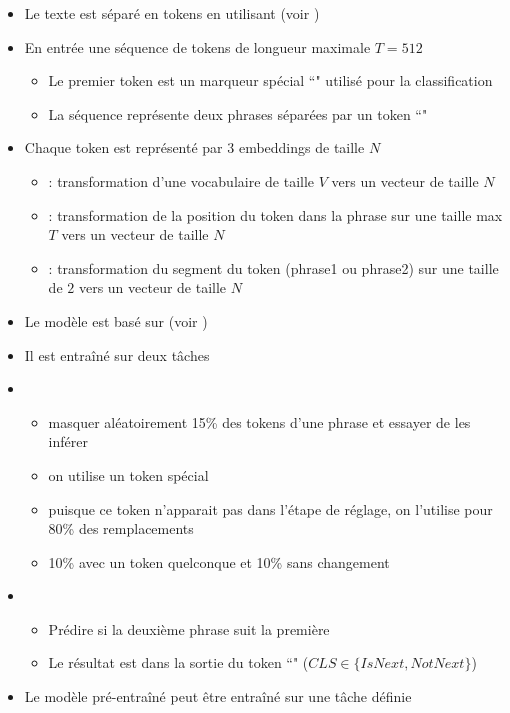 \documentclass{KodeBook}
\begin{document}

\begin{itemize}
	\item Le texte est séparé en tokens en utilisant  (voir \cite{2016-wu-al})
	\item En entrée une séquence de tokens de longueur maximale $T = 512$
	\begin{itemize}
		\item Le premier token est un marqueur spécial ``\keyword{[CLS]}" utilisé pour la classification
		\item La séquence représente deux phrases séparées par un token ``\keyword{[SEP]}"
	\end{itemize}
	\item Chaque token est représenté par 3 embeddings de taille $N$ 
	\begin{itemize}
		\item {} : transformation d'une vocabulaire de taille $V$ vers un vecteur de taille $N$
		\item {} : transformation de la position du token dans la phrase sur une taille max $T$ vers un vecteur de taille $N$
		\item {} : transformation du segment du token (phrase1 ou phrase2) sur une taille de $2$ vers un vecteur de taille $N$
	\end{itemize}
\end{itemize}

\begin{itemize}
	\item Le modèle est basé sur  (voir \cite{2017-vaswani-al})
	\item Il est entraîné sur deux tâches
	\item {}
	\begin{itemize}
		\item masquer aléatoirement 15\% des tokens d'une phrase et essayer de les inférer
		\item on utilise un token spécial \keyword{[MASK]}
		\item puisque ce token n'apparait pas dans l'étape de réglage, on l'utilise pour 80\% des remplacements
		\item 10\% avec un token quelconque et 10\% sans changement 
	\end{itemize}
	\item {}
	\begin{itemize}
		\item Prédire si la deuxième phrase suit la première 
		\item Le résultat est dans la sortie du token ``\keyword{[CLS]}" ($CLS \in \{IsNext, NotNext\}$)
	\end{itemize}
	\item Le modèle pré-entraîné peut être entraîné sur une tâche définie
\end{itemize}
\end{document}
